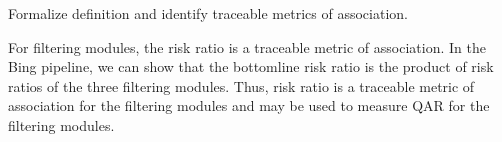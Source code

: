 \documentclass[10pt, onecolumn]{report}
\begin{document}
%
%


\begin{task}\label{task:traceable}
Formalize definition and identify traceable metrics of association.
\end{task}

For filtering modules, the risk ratio is a traceable metric of association. 
In the Bing pipeline, we can show that the bottomline risk ratio is the product of 
risk ratios of the three filtering modules. Thus, risk ratio is
a traceable metric of association for the filtering modules and may be used
to measure QAR for the filtering modules. 
%
\end{document}
